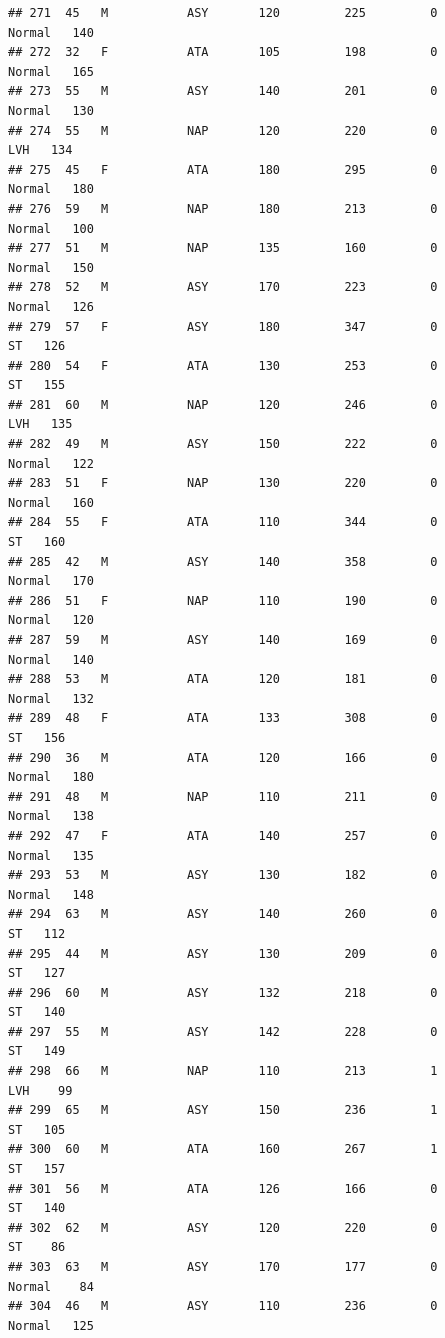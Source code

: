 \documentclass[
]{article}
\begin{document}
\begin{verbatim}
## 271  45   M           ASY       120         225         0     Normal   140
## 272  32   F           ATA       105         198         0     Normal   165
## 273  55   M           ASY       140         201         0     Normal   130
## 274  55   M           NAP       120         220         0        LVH   134
## 275  45   F           ATA       180         295         0     Normal   180
## 276  59   M           NAP       180         213         0     Normal   100
## 277  51   M           NAP       135         160         0     Normal   150
## 278  52   M           ASY       170         223         0     Normal   126
## 279  57   F           ASY       180         347         0         ST   126
## 280  54   F           ATA       130         253         0         ST   155
## 281  60   M           NAP       120         246         0        LVH   135
## 282  49   M           ASY       150         222         0     Normal   122
## 283  51   F           NAP       130         220         0     Normal   160
## 284  55   F           ATA       110         344         0         ST   160
## 285  42   M           ASY       140         358         0     Normal   170
## 286  51   F           NAP       110         190         0     Normal   120
## 287  59   M           ASY       140         169         0     Normal   140
## 288  53   M           ATA       120         181         0     Normal   132
## 289  48   F           ATA       133         308         0         ST   156
## 290  36   M           ATA       120         166         0     Normal   180
## 291  48   M           NAP       110         211         0     Normal   138
## 292  47   F           ATA       140         257         0     Normal   135
## 293  53   M           ASY       130         182         0     Normal   148
## 294  63   M           ASY       140         260         0         ST   112
## 295  44   M           ASY       130         209         0         ST   127
## 296  60   M           ASY       132         218         0         ST   140
## 297  55   M           ASY       142         228         0         ST   149
## 298  66   M           NAP       110         213         1        LVH    99
## 299  65   M           ASY       150         236         1         ST   105
## 300  60   M           ATA       160         267         1         ST   157
## 301  56   M           ATA       126         166         0         ST   140
## 302  62   M           ASY       120         220         0         ST    86
## 303  63   M           ASY       170         177         0     Normal    84
## 304  46   M           ASY       110         236         0     Normal   125

\end{verbatim}
\end{document}
